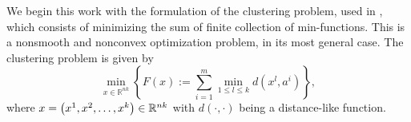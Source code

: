 %

We begin this work with the formulation of the clustering problem, used in \cite{T2007}, which consists of minimizing the sum of finite collection of min-functions. This is a nonsmooth and nonconvex optimization problem, in its most general case. The clustering problem is given by
\begin{equation}
	\min\limits_{x \in \mathbb{R}^{nk}} \left\lbrace F(x) := \sum\limits_{i=1}^{m} \min\limits_{1 \le l \le k} d(x^l,a^i) \right\rbrace , \label{clustering_objective}
\end{equation}
where $x=\left( x^1,x^2, \ldots, x^k \right) \in \mathbb{R}^{nk}$ with $\textit{d}(\cdot ,\cdot)$ being a distance-like function. \medskip

